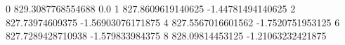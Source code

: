 0 829.3087768554688 0.0
1 827.8609619140625 -1.44781494140625
2 827.73974609375 -1.56903076171875
4 827.5567016601562 -1.7520751953125
6 827.7289428710938 -1.579833984375
8 828.09814453125 -1.21063232421875
